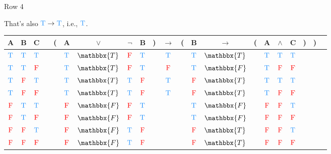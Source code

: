 \documentclass[
  ignorenonframetext,
]{beamer}
\renewcommand{\,}{\text{, }}
\def\True{\textcolor{dodgerblue}{\text{T}}}
\def\False{\textcolor{red}{\text{F}}}
\begin{document}
\begin{frame}{Row 4}
\protect\hypertarget{row-4-1}{}

That's also \(\True \rightarrow \True\), i.e., \(\True\).

\begin{center}
\bigskip
\begin{tabular}{@{ }c@{ }@{ }c@{ }@{ }c | c@{ }@{}c@{}@{ }c@{ }@{ }c@{ }@{ }c@{ }@{ }c@{ }@{}c@{}@{ }c@{ }@{}c@{}@{ }c@{ }@{ }c@{ }@{}c@{}@{ }c@{ }@{ }c@{ }@{ }c@{ }@{}c@{}@{}c@{}@{ }c}
A & B & C &  & ( & A & $\vee$ & $\neg$ & B & ) & $\rightarrow$ & ( & B & $\rightarrow$ & ( & A & $\wedge$ & C & ) & ) & \\
\hline 
 $\True$ & $\True$ & $\True$ &  &  & $\True$ & $\mathbbx{T}$ & $\False$ & $\True$ &  &\textcolor{red}{$\True$}&  & $\True$ & $\mathbbx{T}$ &  & $\True$ & $\True$ & $\True$ &  &  & \\
 $\True$ & $\True$ & $\False$ &  &  & $\True$ & $\mathbbx{T}$ & $\False$ & $\True$ &  &\textcolor{red}{$\False$}&  & $\True$ & $\mathbbx{F}$ &  & $\True$ & $\False$ & $\False$ &  &  & \\
 $\True$ & $\False$ & $\True$ &  &  & $\True$ & $\mathbbx{T}$ & $\True$ & $\False$ &  &\textcolor{red}{$\True$}&  & $\False$ & $\mathbbx{T}$ &  & $\True$ & $\True$ & $\True$ &  &  & \\
 $\True$ & $\False$ & $\False$ &  &  & $\True$ & $\mathbbx{T}$ & $\True$ & $\False$ &  &\textcolor{red}{$\True$}&  & $\False$ & $\mathbbx{T}$ &  & $\True$ & $\False$ & $\False$ &  &  & \\
 $\False$ & $\True$ & $\True$ &  &  & $\False$ & $\mathbbx{F}$ & $\False$ & $\True$ &  &&  & $\True$ & $\mathbbx{F}$ &  & $\False$ & $\False$ & $\True$ &  &  & \\
 $\False$ & $\True$ & $\False$ &  &  & $\False$ & $\mathbbx{F}$ & $\False$ & $\True$ &  &&  & $\True$ & $\mathbbx{F}$ &  & $\False$ & $\False$ & $\False$ &  &  & \\
 $\False$ & $\False$ & $\True$ &  &  & $\False$ & $\mathbbx{F}$ & $\True$ & $\False$ &  &&  & $\False$ & $\mathbbx{T}$ &  & $\False$ & $\False$ & $\True$ &  &  & \\
 $\False$ & $\False$ & $\False$ &  &  & $\False$ & $\mathbbx{F}$ & $\True$ & $\False$ &  &&  & $\False$ & $\mathbbx{T}$ &  & $\False$ & $\False$ & $\False$ &  &  & \\
\end{tabular}
\bigskip
\end{center}

\end{frame}
\end{document}
